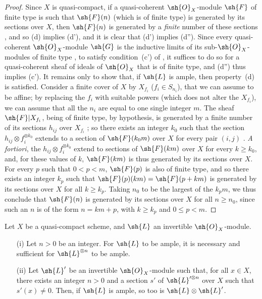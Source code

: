 \begin{proof}
Since $X$ is quasi-compact, if a quasi-coherent $\sh{O}_X$-module $\sh{F}$ of finite type is such that $\sh{F}(n)$ (which is of finite type) is generated by its sections over $X$, then $\sh{F}(n)$ is generated by a \emph{finite} number of these sections , and so (d) implies (d'), and it is clear that (d') implies (d'').
Since every quasi-coherent $\sh{O}_X$-module $\sh{G}$ is the inductive limits of its sub-$\sh{O}_X$-modules of finite type , to satisfy condition~(c') of , it suffices to do so for a quasi-coherent sheaf of ideals of $\sh{O}_X$ that is of finite type, and (d'') thus implies (c').
It remains only to show that, if $\sh{L}$ is ample, then property~(d) is satisfied.
Consider a finite cover of $X$ by $X_{f_i}$ ($f_i\in S_{n_i}$), that we can assume to be affine;
by replacing the $f_i$ with suitable powers (which does not alter the $X_{f_i}$), we can assume that all the $n_i$ are equal to one single integer $m$.
The sheaf $\sh{F}|X_{f_i}$, being of finite type, by hypothesis, is generated by a finite number of its sections $h_{ij}$ over $X_{f_i}$ ;
so there exists an integer $k_0$ such that the section $h_{ij}\otimes f_i^{\otimes k_0}$ extends to a section of $\sh{F}(k_0m)$ over $X$ for every pair $(i,j)$ .
\emph{A fortiori}, the $h_{ij}\otimes f_i^{\otimes k_0}$ extend to sections of $\sh{F}(km)$ over $X$ for every $k\geq k_0$, and, for these values of $k$, $\sh{F}(km)$ is thus generated by its sections over $X$.
For every $p$ such that $0<p<m$, $\sh{F}(p)$ is also of finite type, and so there exists an integer $k_p$ such that $\sh{F}(p)(km)=\sh{F}(p+km)$ is generated by its sections over $X$ for all $k\geq k_p$.
Taking $n_0$ to be the largest of the $k_pm$, we thus conclude that $\sh{F}(n)$ is generated by its sections over $X$ for all $n\geq n_0$, since such an $n$ is of the form $n=km+p$, with $k\geq k_p$ and $0\leq p<m$.
\end{proof}

\begin{proposition}[4.5.6]
\label{II.4.5.6}
  Let $X$ be a quasi-compact scheme, and $\sh{L}$ an invertible $\sh{O}_X$-module.
  \begin{enumerate}
    \item[\rm{(i)}] Let $n>0$ be an integer. For $\sh{L}$ to be ample, it is necessary and sufficient for $\sh{L}^{\otimes n}$ to be ample.
    \item[\rm{(ii)}] Let $\sh{L}'$ be an invertible $\sh{O}_X$-module such that, for all $x\in X$, there exists an integer $n>0$
      and a section $s'$ of $\sh{L}'^{\otimes n}$ over $X$ such that $s'(x)\neq0$.
      Then, if $\sh{L}$ is ample, so too is $\sh{L}\otimes\sh{L}'$.
  \end{enumerate}
\end{proposition}

